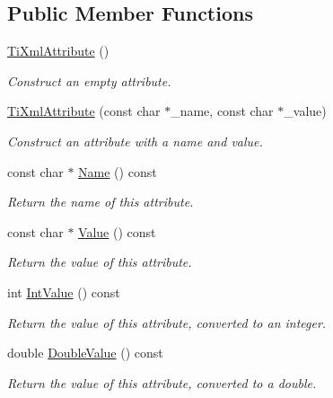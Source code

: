 \subsection*{Public Member Functions}
\begin{DoxyCompactItemize}
\item 
\hyperlink{classTiXmlAttribute_a9cfa3c8179873fd485d83003b114f8e1}{TiXmlAttribute} ()
\begin{DoxyCompactList}\small\item\em Construct an empty attribute. \item\end{DoxyCompactList}\item 
\hyperlink{classTiXmlAttribute_a759d0b76fb8fcf765ecab243bc14f05e}{TiXmlAttribute} (const char $\ast$\_\-name, const char $\ast$\_\-value)
\begin{DoxyCompactList}\small\item\em Construct an attribute with a name and value. \item\end{DoxyCompactList}\item 
const char $\ast$ \hyperlink{classTiXmlAttribute_a298a57287d305904ba6bd96ae6f78d3d}{Name} () const 
\begin{DoxyCompactList}\small\item\em Return the name of this attribute. \item\end{DoxyCompactList}\item 
const char $\ast$ \hyperlink{classTiXmlAttribute_a0f874490eac8ca00ee0070765d0e97e3}{Value} () const 
\begin{DoxyCompactList}\small\item\em Return the value of this attribute. \item\end{DoxyCompactList}\item 
int \hyperlink{classTiXmlAttribute_aa1a20ad59dc7e89a0ab265396360d50f}{IntValue} () const 
\begin{DoxyCompactList}\small\item\em Return the value of this attribute, converted to an integer. \item\end{DoxyCompactList}\item 
double \hyperlink{classTiXmlAttribute_a2880ddef53fc7522c99535273954d230}{DoubleValue} () const 
\begin{DoxyCompactList}\small\item\em Return the value of this attribute, converted to a double. \item\end{DoxyCompactList}\item 

\end{DoxyCompactItemize}
